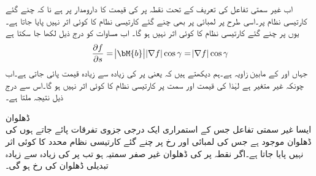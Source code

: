 اب غیر سمتی تفاعل کی تعریف کے تحت نقطہ  پر  کی قیمت کا دارومدار  پر ہے نا کہ چنے گئے کارتیسی نظام پر۔اسی طرح  پر لمبائی  پر بھی چنے گئے کارتیسی نظام کا کوئی اثر نہیں پایا جاتا ہے۔یوں  پر چنے گئے کارتیسی نظام کا کوئی اثر نہیں ہو گا۔ اب مساوات  کو درج ذیل لکھا جا سکتا ہے
\begin{align*}
\frac{\partial f}{\partial s}=\abs{\bM{b}}\abs{\nabla f}\cos \gamma=\abs{\nabla f}\cos \gamma
\end{align*}
جہاں  اور  کے مابین زاویہ  ہے۔ہم دیکھتے ہیں کہ   یعنی  پر  کی زیادہ سے زیادہ قیمت  پائی جاتی ہے۔اب چونکہ  غیر متغیر ہے لہٰذا   کی قیمت اور سمت پر کارتیسی نظام کا کوئی اثر نہیں ہو گا۔اس سے درج ذیل نتیجہ ملتا ہے۔

\quad ڈھلوان\\
ایسا غیر سمتی تفاعل   جس کے استمراری ایک درجی جزوی تفرقات پائے جاتے ہوں کی ڈھلوان موجود ہے جس کی لمبائی اور رخ پر چنے گئے کارتیسی نظام محدد کا کوئی اثر نہیں پایا جاتا ہے۔اگر نقطہ  پر  کی ڈھلوان غیر صفر سمتیہ ہو تب  پر  کی زیادہ سے زیادہ تبدیلی ڈھلوان کی رخ ہو گی۔ 

